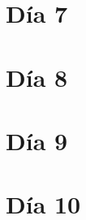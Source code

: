 \documentclass[12pt,final,twoside,onecolumn,openright,titlepage]{book}
\numberwithin{equation}{section}  %
\begin{document}
    \chapter{Día 7}

      

    \chapter{Día 8}

      

    \chapter{Día 9}

      

    \chapter{Día 10}

      
\end{document}
